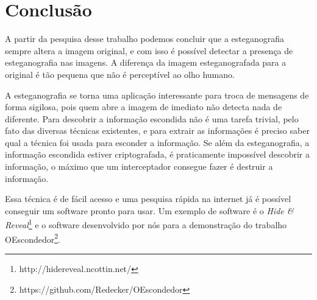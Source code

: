 \documentclass[12pt]{article}
\begin{document}
\section{Conclusão}

A partir da pesquisa desse trabalho podemos concluir que a esteganografia sempre altera a imagem original, e com isso é possível detectar a presença de esteganografia nas imagens. A diferença da imagem esteganografada para a original é tão pequena que não é perceptível ao olho humano. 

A esteganografia se torna uma aplicação interessante para troca de mensagens de forma sigilosa, pois quem abre a imagem de imediato não detecta nada de diferente. Para descobrir a informação escondida não é uma tarefa trivial, pelo fato das diversas técnicas existentes, e para extrair as informações é preciso saber qual a técnica foi usada para esconder a informação. Se além da esteganografia, a informação escondida estiver criptografada, é praticamente impossível descobrir a informação, o máximo que um interceptador consegue fazer é destruir a informação. 

Essa técnica é de fácil acesso e uma pesquisa rápida na internet já é possível conseguir um software pronto para usar. Um exemplo de software é o \textit{Hide \& Reveal}\footnote{http://hidereveal.ncottin.net/} e o software desenvolvido por nós para a demonstração do trabalho OEscondedor\footnote{https://github.com/Redecker/OEscondedor}.





\end{document}
